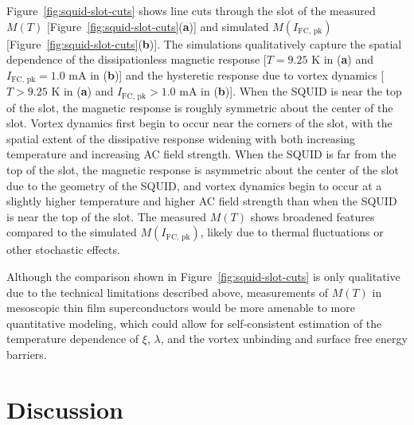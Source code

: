 \documentclass[%
 reprint,
 superscriptaddress,
 amsmath,
 amssymb,
 amsfonts,
 aps,
 prb,
]{revtex4-2}
\newcommand{\FC}{\mathrm{FC}}
\newcommand{\pk}{\mathrm{pk}}
\begin{document}
Figure~\ref{fig:squid-slot-cuts} shows line cuts through the slot of the measured $M(T)$ [Figure~\ref{fig:squid-slot-cuts}({\bf a})] and simulated $M(I_{\FC,\,\pk})$ [Figure~\ref{fig:squid-slot-cuts}({\bf b})]. The simulations qualitatively capture the spatial dependence of the dissipationless magnetic response [$T=9.25$ K in ({\bf a}) and $I_{\FC,\,\pk}=1.0$ mA in ({\bf b})] and the hysteretic response due to vortex dynamics [$T>9.25$ K in ({\bf a}) and $I_{\FC,\,\pk}>1.0$ mA in ({\bf b})]. When the SQUID is near the top of the slot, the magnetic response is roughly symmetric about the center of the slot. Vortex dynamics first begin to occur near the corners of the slot, with the spatial extent of the dissipative response widening with both increasing temperature and increasing AC field strength. When the SQUID is far from the top of the slot, the magnetic response is asymmetric about the center of the slot due to the geometry of the SQUID, and vortex dynamics begin to occur at a slightly higher temperature and higher AC field strength than when the SQUID is near the top of the slot. The measured $M(T)$ shows broadened features compared to the simulated $M(I_{\FC,\,\pk})$, likely due to thermal fluctuations or other stochastic effects.

Although the comparison shown in Figure~\ref{fig:squid-slot-cuts} is only qualitative due to the technical limitations described above, measurements of $M(T)$ in mesoscopic thin film superconductors would be more amenable to more quantitative modeling, which could allow for self-consistent estimation of the temperature dependence of $\xi$, $\lambda$, and the vortex unbinding and surface free energy barriers.

\section{Discussion}
\label{sec:discussion}
\end{document}
